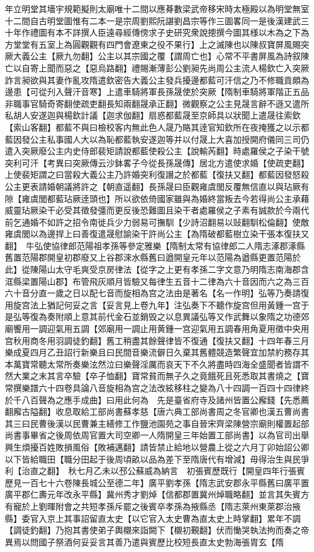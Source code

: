 年立明堂其墻宇規範擬則太廟唯十二間以應朞數梁武帝移宋時太極殿以為明堂無室十二間自古明堂圖惟有二本一是宗周劉熙阮諶劉昌宗等作三圖畧同一是後漢建武三十年作禮圖有本不詳撰人臣遠尋經傳傍求子史研究衆說摠撰今圖其様以木為之下為方堂堂有五室上為圓觀觀有四門會遼東之役不果行】上之滅陳也以陳叔寶屏風賜突厥大義公主【厥九勿翻】公主以其宗國之覆【謂周亡也】心常不平書屏風為詩叙陳亡以自寄上聞而惡之【惡烏路翻】禮賜漸薄彭公劉昶先尚周公主流人楊欽亡入突厥詐言昶欲與其妻作亂攻隋遣欽密告大義公主發兵擾邊都藍可汗信之乃不修職貢頗為邊患【可從刋入聲汗音寒】上遣車騎將軍長孫晟使於突厥【隋制車騎將軍階正五品非職事官騎奇寄翻使疏吏翻長知兩翻晟承正翻】微觀察之公主見晟言辭不遜又遣所私胡人安遂迦與楊欽計議【迦求伽翻】扇惑都藍晟至京師具以狀聞上遣晟往索欽【索山客翻】都藍不與曰檢校客内無此色人晟乃賂其逹官知欽所在夜掩獲之以示都藍因發公主私事國人大以為恥都藍執安遂迦等并以付晟上大喜加授開府儀同三司仍遣入突厥廢公主内史侍郎裴矩請說都藍使殺公主【說輸芮翻】時處羅侯之子染干號突利可汗【考異曰突厥傳云沙鉢畧子今從長孫晟傳】居北方遣使求婚【使疏吏翻】上使裴矩謂之曰當殺大義公主乃許婚突利復譖之於都藍【復扶又翻】都藍因發怒殺公主更表請婚朝議將許之【朝直遥翻】長孫晟曰臣觀雍虞閭反覆無信直以與玷厥有隙【雍虞閭都藍玷厥逹頭也】所以欲依倚國家雖與為婚終當叛去今若得尚公主承藉威靈玷厥染干必受其徵發彊而更反後恐難圖且染干者處羅侯之子素有誠款於今兩代前乞通婚不如許之招令南徙兵少力弱易可撫馴【少詩沼翻易以䜴翻馴松倫翻】使敵雍虞閭以為邊捍上曰善復遣晟慰諭染干許尚公主【為隋破都藍樹立染干張本復扶又翻】　牛弘使協律郎范陽祖孝孫等參定雅樂【隋制太常有協律郎二人隋志涿郡涿縣舊置范陽郡開皇初郡廢又上谷郡淶水縣舊曰遒開皇元年以范陽為遒縣更置范陽於此】從陳陽山太守毛爽受京房律法【從字之上更有孝孫二字文意乃明隋志南海郡含洭縣梁置陽山郡】布管飛灰順月皆驗又每律生五音十二律為六十音因而六之為三百六十音分直一歲之日以配七音而旋相為宫之法由是著名【名一作明】弘等乃奏請復用旋宫法上猶記何妥之言【妥言見上卷九年】注弘奏下不聽作旋宫但用黃鍾一宫于是弘等復為奏附順上意其前代金石並銷毁之以息異議弘等又作武舞以象隋之功德郊廟饗用一調迎氣用五調【郊廟用一調止用黄鍾一宫迎氣用五調春用角夏用徵中央用宫秋用商冬用羽調徒釣翻】舊工稍盡其餘聲律皆不復通【復扶又翻】十四年春三月樂成夏四月乙丑詔行新樂且曰民間音樂流僻日久棄其舊體競造繁聲宜加禁約務存其本萬寶常聽太常所奏樂泫然泣曰樂聲淫厲而哀天下不久將盡時四海全盛聞者皆謂不然大業之末其言卒驗【卒子恤翻】寶常貧而無子久之竟餓死且死悉取其書燒之【寶常撰樂譜六十四卷具論八音旋相為宫之法改絃移柱之變為八十四調一百四十四律終於千八百聲為之應手成曲】曰用此何為　先是臺省府寺及諸州皆置公廨錢【先悉薦翻廨古隘翻】收息取給工部尚書蘇孝慈【唐六典工部尚書周之冬官卿也漢五曹尚書其三曰民曹後漢以民曹兼主繕修工作鹽池園苑之事自晉宋齊梁陳營宗廟則權置起部尚書事畢省之後周依周官置大司空卿一人隋開皇三年始置工部尚書】以為官司出舉興生煩擾百姓敗損風俗【敗補邁翻】請皆禁止給地以營農上從之六月丁卯始詔公卿以下皆給職田【職分田起于後周頃畝以品為差下至隋唐代有增減】毋得治生與民爭利【治直之翻】　秋七月乙未以邳公蘇威為納言　初張賓歷既行【開皇四年行張賓歷見一百七十六卷陳長城公至德二年】廣平劉孝孫【隋志武安郡永平縣舊曰廣平置廣平郡仁夀元年改永平縣】冀州秀才劉焯【信都郡置冀州焯職略翻】並言其失賓方有寵於上劉暉附會之共短孝孫斥罷之後賓卒孝孫為掖縣丞【隋志萊州東萊郡治掖縣】委官入京上其事詔留直太史【以它官入太史曹為直太史上時掌翻】累年不調【調徒釣翻】乃抱其書使弟子輿櫬來詣闕下【櫬初覲翻】伏而慟哭執法拘而奏之帝異焉以問國子祭酒何妥妥言其善乃遣與賓歷比校短長直太史勃海張胄玄【隋